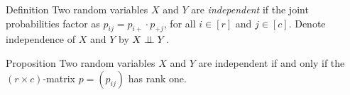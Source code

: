 \begin{frame}
    \begin{block}{Definition}
        Two random variables $X$ and $Y$ are \emph{independent} if the joint probabilities factor as $p_{ij} = p_{i+}\cdot p_{+j}$, for all $i \in [r]$ and $j \in [c]$. Denote independence of $X$ and $Y$ by $X \perp \!\!\! \perp Y$.
    \end{block}

    \begin{block}{Proposition}
        Two random variables $X$ and $Y$ are independent if and only if the $(r \times c)$-matrix $p = (p_{ij})$ has rank one.
    \end{block}
\end{frame}